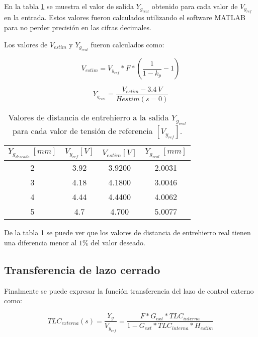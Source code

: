 En la tabla \ref{tension-ref-vs-separacion-real} se muestra el valor de salida $Y_{g_{real}}$ obtenido para cada valor de $V_{y_{ref}}$ en la entrada. Estos valores fueron calculados utilizando el software MATLAB para no perder precisión en las cifras decimales.

Los valores de $V_{estim}$ y $Y_{g_{real}}$ fueron calculados como:

\begin{equation}
	V_{estim}=V_{y_{ref}}*F*(\frac{1}{1-k_p}-1)
\end{equation}

\begin{equation}
	Y_{g_{real}}=\frac{V_{estim}-3.4\:V}{H{estim}(s=0)}
\end{equation}

\begin{table}[H]
	\begin{center}
		\begin{tabular}{| c | c | c | c |}
			\hline
			$Y_{g_{deseado}}\:[mm]$ & $V_{y_{ref}}[V]$& $V_{estim}[V]$& $Y_{g_{real}}\:[mm]$\\ \hline
			2 &	3.92 & 3.9200 & 2.0031 \\ \hline
			3 & 4.18 & 4.1800 & 3.0046\\ \hline
			4 & 4.44 & 4.4400 & 4.0062 \\ \hline
			5 & 4.7 & 4.700 & 5.0077\\ \hline	
		\end{tabular}
		\caption{Valores de distancia de entrehierro a la salida $Y_{g_{real}}$ para cada valor de tensión de referencia $[V_{y_{ref}}]$.}
		\label{tension-ref-vs-separacion-real}
	\end{center}
\end{table}

De la tabla \ref{tension-ref-vs-separacion-real} se puede ver que los valores de distancia de entrehierro real tienen una diferencia menor al $1\%$ del valor deseado.



\subsection{Transferencia de lazo cerrado}

Finalmente se puede expresar la función transferencia del lazo de control externo como:

\begin{equation}
	TLC_{externa}(s)=\frac{Y_g}{V_{y_{ref}}}=\frac{F*G_{ext}*TLC_{interna}}{1-G_{ext}*TLC_{interna}*H_{estim}}
\end{equation}

